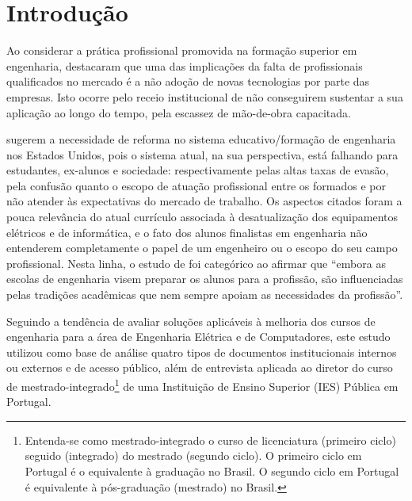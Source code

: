 \documentclass{textolivre}
\begin{document}
\begin{polyabstract}
\begin{english}
\begin{abstract}
\end{abstract}
\end{english}

\end{polyabstract}


\section{Introdução}\label{sec-intro}
Ao considerar a prática profissional promovida na formação superior em engenharia, \textcite{nager2016} destacaram que uma das implicações da falta de profissionais qualificados no mercado é a não adoção de novas tecnologias por parte das empresas. Isto ocorre pelo receio institucional de não conseguirem sustentar a sua aplicação ao longo do tempo, pela escassez de mão-de-obra capacitada.

\textcite{maciejewski2017} sugerem a necessidade de reforma no sistema educativo/formação de engenharia nos Estados Unidos, pois o sistema atual, na sua perspectiva, está falhando para estudantes, ex-alunos e sociedade: respectivamente pelas altas taxas de evasão, pela confusão quanto o escopo de atuação profissional entre os formados e por não atender às expectativas do mercado de trabalho. Os aspectos citados foram a pouca relevância do atual currículo associada à desatualização dos equipamentos elétricos e de informática, e o fato dos alunos finalistas em engenharia não entenderem completamente o papel de um engenheiro ou o escopo do seu campo profissional. Nesta linha, o estudo de \textcite[p. 4]{sheppard2008} foi categórico ao afirmar que “embora as escolas de engenharia visem preparar os alunos para a profissão, são influenciadas pelas tradições acadêmicas que nem sempre apoiam as necessidades da profissão”.

Seguindo a tendência de avaliar soluções aplicáveis à melhoria dos cursos de engenharia para a área de Engenharia Elétrica e de Computadores, este estudo utilizou como base de análise quatro tipos de documentos institucionais internos ou externos e de acesso público, além de entrevista aplicada ao diretor do curso de mestrado-integrado\footnote{Entenda-se como mestrado-integrado o curso de licenciatura (primeiro ciclo) seguido (integrado) do mestrado (segundo ciclo). O primeiro ciclo em Portugal é o equivalente à graduação no Brasil. O segundo ciclo em Portugal é equivalente à pós-graduação (mestrado) no Brasil.} de uma Instituição de Ensino Superior (IES) Pública em Portugal.
\end{document}

